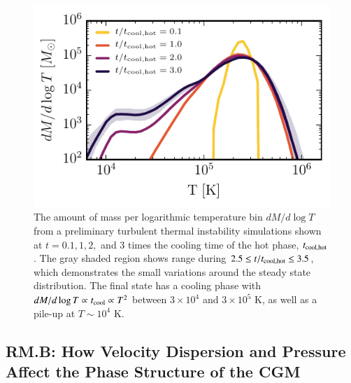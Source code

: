 \documentclass[11pt,letterpaper,english]{article}
\begin{document}
\begin{figure}[h]
    \centering
    \begin{minipage}{0.5\textwidth}
        \includegraphics[width=1.\textwidth]{dMdlogT_proposal_t.pdf} 
    \end{minipage}\hfill
    \begin{minipage}{0.5\textwidth}
	\caption{  The amount of mass per logarithmic temperature bin $dM / d\log T$ from a preliminary turbulent thermal instability simulations shown at $t = 0.1,1,2,$ and $3$ times the cooling time of the hot phase, $t_{\rm cool,hot}$. The gray shaded region shows range during $ 2.5 \leq t / t_{\rm cool,hot} \leq 3.5$, which demonstrates the small variations around the steady state distribution. The final state has a cooling phase with $dM / d\log T \propto t_{\rm cool} \propto T^2$ between $3\times10^4$ and $3\times10^5$ K, as well as a pile-up at $T\sim10^4$ K. \label{fig:sim_phase}}
    \end{minipage}
\end{figure}


\vspace{-.25in}
\subsection{RM.B: How Velocity Dispersion and Pressure Affect the Phase Structure of the CGM}
\vspace{-.2in}
\end{document}
